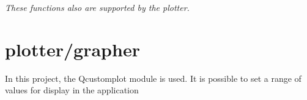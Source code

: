 \documentclass[12pt, a4paper]{article}
\begin{document}
\textit{These functions also are supported by the plotter.}

\pagebreak

\section{plotter/grapher}

In this project, the Qcustomplot module is used.
It is possible to set a range of values for display in the application
\end{document}
